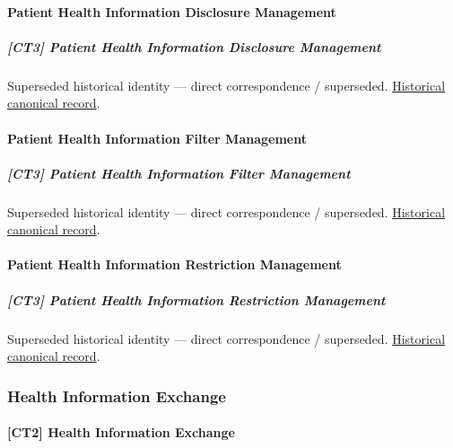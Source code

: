 \paragraph{Patient Health Information Disclosure Management}

\subparagraph{[CT3] Patient Health Information Disclosure Management}

\par\label{element:07cf507f183d4905a7ad2adbb8555df5}
Superseded historical identity — direct correspondence / superseded. \href{../../../../continuum/strategy/capability/07cf507f183d4905a7ad2adbb8555df5.md}{Historical canonical record}.\par

\paragraph{Patient Health Information Filter Management}

\subparagraph{[CT3] Patient Health Information Filter Management}

\par\label{element:589f192797454d9e8960fb63774e5e9c}
Superseded historical identity — direct correspondence / superseded. \href{../../../../continuum/strategy/capability/589f192797454d9e8960fb63774e5e9c.md}{Historical canonical record}.\par

\paragraph{Patient Health Information Restriction Management}

\subparagraph{[CT3] Patient Health Information Restriction Management}

\par\label{element:5ad91d045474435a96b560e66ff7de05}
Superseded historical identity — direct correspondence / superseded. \href{../../../../continuum/strategy/capability/5ad91d045474435a96b560e66ff7de05.md}{Historical canonical record}.\par

\subsubsection{Health Information Exchange}

\paragraph{[CT2] Health Information Exchange}

